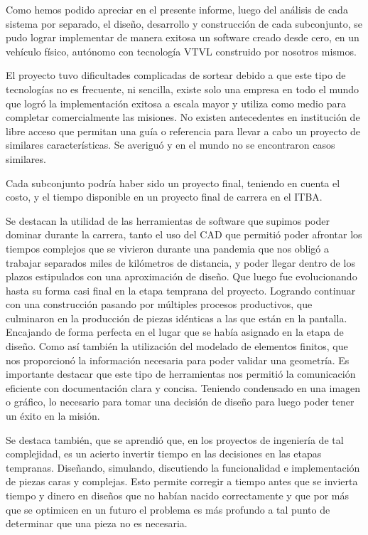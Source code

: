 Como hemos podido apreciar en el presente informe, luego del análisis de cada sistema por separado, el diseño, desarrollo y construcción de cada subconjunto, se pudo lograr implementar de manera exitosa un software creado desde cero, en un vehículo físico, autónomo con tecnología VTVL construido por nosotros mismos.

\medskip

El proyecto tuvo dificultades complicadas de sortear debido a que este tipo de tecnologías no es frecuente, ni sencilla, existe solo una empresa en todo el mundo que logró la implementación exitosa a escala mayor y utiliza como medio para completar comercialmente las misiones. No existen antecedentes en institución de libre acceso que permitan una guía o referencia para llevar a cabo un proyecto de similares características. Se averiguó y en el mundo no se encontraron casos similares.

Cada subconjunto podría haber sido un proyecto final, teniendo en cuenta el costo, y el tiempo disponible en un proyecto final de carrera en el ITBA.

Se destacan la utilidad de las herramientas de software que supimos poder dominar durante la carrera, tanto el uso del CAD que permitió poder afrontar los tiempos complejos que se vivieron durante una pandemia que nos obligó a trabajar separados miles de kilómetros de distancia, y poder llegar dentro de los plazos estipulados con una aproximación de diseño. Que luego fue evolucionando hasta su forma casi final en la etapa temprana del proyecto. Logrando continuar con una construcción pasando por múltiples procesos productivos, que culminaron en la producción de piezas idénticas a las que están en la pantalla. Encajando de forma perfecta en el lugar que se había asignado en la etapa de diseño. Como así también la utilización del modelado de elementos finitos, que nos proporcionó la información necesaria para poder validar una geometría. Es importante destacar que este tipo de herramientas nos permitió la comunicación eficiente con documentación clara y concisa. Teniendo condensado en una imagen o gráfico, lo necesario para tomar una decisión de diseño para luego poder tener un éxito en la misión.

\medskip

Se destaca también, que se aprendió que, en los proyectos de ingeniería de tal complejidad, es un acierto invertir tiempo en las decisiones en las etapas tempranas. Diseñando, simulando, discutiendo la funcionalidad e implementación de piezas caras y complejas. Esto permite corregir a tiempo antes que se invierta tiempo y dinero en diseños que no habían nacido correctamente y que por más que se optimicen en un futuro el problema es más profundo a tal punto de determinar que una pieza no es necesaria.

